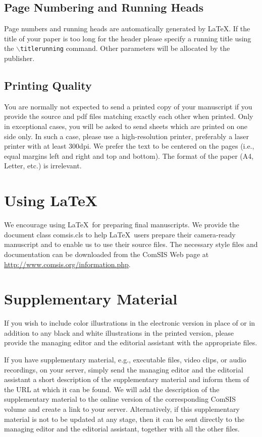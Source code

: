 \documentclass[runningheads]{comsis}
\begin{document}
\subsection{Page Numbering and Running Heads}

Page numbers and running heads are automatically generated by \LaTeX. If the
title of your paper is too long for the header please specify a running title
using the \texttt{$\backslash$titlerunning} command. Other parameters will be
allocated by the publisher.

\subsection{Printing Quality}

You are normally not expected to send a printed copy of your manuscript if you
provide the source and pdf files matching exactly each other when printed.
Only in exceptional cases, you will be asked to send sheets which are printed
on one side only. In such a case, please use a high-resolution printer,
preferably a laser printer with at least 300dpi. We prefer the text to be
centered on the pages (i.e., equal margins left and right and top and bottom).
The format of the paper (A4, Letter, etc.) is irrelevant.


\section{Using \LaTeX}\label{sec:latex}

We encourage using \LaTeX\ for preparing final manuscripts. We provide the
document class comsis.cls to help \LaTeX\ users prepare their camera-ready
manuscript and to enable us to use their source files. The necessary style
files and documentation can be downloaded from the ComSIS Web page at
\url{http://www.comsis.org/information.php}.


\section{Supplementary Material}

If you wish to include color illustrations in the electronic version in place
of or in addition to any black and white illustrations in the printed version,
please provide the managing editor and the editorial assistant with the
appropriate files.

If you have supplementary material, e.g., executable files, video clips, or
audio recordings, on your server, simply send the managing editor and the
editorial assistant a short description of the supplementary material and
inform them of the URL at which it can be found. We will add the description
of the supplementary material to the online version of the corresponding
ComSIS volume and create a link to your server. Alternatively, if this
supplementary material is not to be updated at any stage, then it can be sent
directly to the managing editor and the editorial assistant, together with all
the other files.
\end{document}
